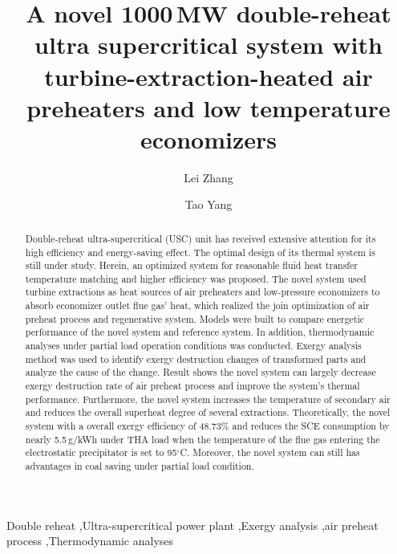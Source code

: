\documentclass[preprint,12pt]{elsarticle}
\begin{document}
\begin{frontmatter}



\title{A novel 1000\,MW double-reheat ultra supercritical system with turbine-extraction-heated air preheaters and low temperature economizers}


\author[hust,ncst]{Lei Zhang}
\author[hust]{Tao Yang}

\address[hust]{School of Energy and Power Engineering, Huazhong University of Science and Technology, Wuhan 430074,China}
\address[ncst]{College of Metallurgy and Energy, NorthChina University of Science and and Technology, Tangshan 063009,China}

\begin{abstract}%
Double-reheat ultra-supercritical (USC) unit has received extensive attention for its high efficiency and energy-saving effect.
The optimal design of its thermal system is still under study.
Herein, an optimized system for reasonable fluid heat transfer temperature matching and higher efficiency was proposed.
The novel system used turbine extractions as heat sources of air preheaters and low-pressure economizers to absorb economizer outlet flue gas’ heat, which realized the join optimization of air preheat process and regenerative system.
Models were built to compare energetic performance of the novel system and reference system.
In addition, thermodynamic analyses under partial load operation conditions was conducted. 
Exergy analysis method was used to identify exergy destruction changes of transformed parts and analyze the cause of the change.
Result shows the novel system can largely decrease exergy destruction rate of air preheat process and improve the system's thermal performance.
Furthermore, the novel system increases the temperature of secondary air and reduces the overall superheat degree of several extractions.
Theoretically, the novel system with a overall exergy efficiency of 48.73\%  and reduces the SCE consumption by nearly 5.5\,g/kWh under THA load when the temperature of the flue gas entering the electrostatic precipitator is set to 95$^\circ$C.
Moreover, the novel system can still has advantages in coal saving under partial load condition.

\end{abstract}

\begin{keyword}
Double reheat \sep Ultra-supercritical power plant \sep Exergy analysis \sep air preheat process \sep Thermodynamic analyses
\end{keyword}

\end{frontmatter}
\end{document}
